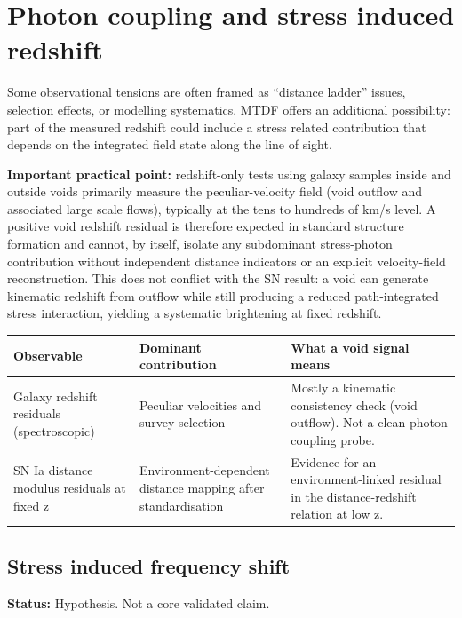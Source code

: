 \documentclass[11pt,a4paper]{article}
\begin{document}
\section{Photon coupling and stress induced redshift}
\label{sec:photon}
Some observational tensions are often framed as ``distance ladder'' issues, selection effects, or modelling systematics.
MTDF offers an additional possibility: part of the measured redshift could include a stress related contribution that depends on the integrated field state along the line of sight.

\textbf{Important practical point:} redshift-only tests using galaxy samples inside and outside voids primarily measure the peculiar-velocity field (void outflow and associated large scale flows), typically at the tens to hundreds of km/\allowbreak{}s level. A positive void redshift residual is therefore expected in standard structure formation and cannot, by itself, isolate any subdominant stress-photon contribution without independent distance indicators or an explicit velocity-field reconstruction. This does not conflict with the SN result: a void can generate kinematic redshift from outflow while still producing a reduced path-integrated stress interaction, yielding a systematic brightening at fixed redshift.

\begin{table}[H]
\centering
\footnotesize
\begin{tabularx}{\linewidth}{l>{\RaggedRight\arraybackslash}X>{\RaggedRight\arraybackslash}X}
\toprule
\textbf{Observable} & \textbf{Dominant contribution} & \textbf{What a void signal means} \tabularnewline
\midrule
Galaxy redshift residuals (spectroscopic) & Peculiar velocities and survey selection & Mostly a kinematic consistency check (void outflow). Not a clean photon coupling probe. \tabularnewline
SN Ia distance modulus residuals at fixed z & Environment-dependent distance mapping after standardisation & Evidence for an environment-linked residual in the distance-redshift relation at low z. \tabularnewline
\bottomrule
\end{tabularx}
\end{table}

\subsection{Stress induced frequency shift}
\begin{mdframed}[linecolor=accent,linewidth=0.5pt,backgroundcolor=callout-bg,leftline=true,rightline=true,topline=true,bottomline=true,innerleftmargin=8pt,innerrightmargin=8pt,innertopmargin=6pt,innerbottommargin=6pt]
\textbf{Status:} Hypothesis. Not a core validated claim.
\end{mdframed}
\end{document}
